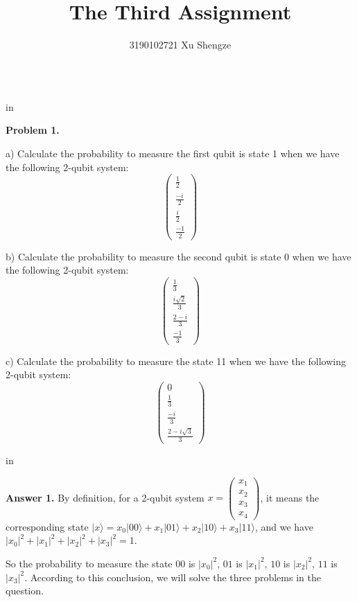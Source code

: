 \documentclass[11pt]{article}
\begin{document}
\title{{\bf The Third Assignment}}
\author{3190102721 Xu Shengze}
\date{}
\maketitle

\begin{tabular*}{13cm}{r}
\hline
\end{tabular*}

 in

{\bf Problem 1.} 

a) Calculate the probability to measure the first qubit is state 1 when we have the following 2-qubit system:
$$
\begin{pmatrix}
\frac{1}{2}\\
\frac{-i}{2}\\
\frac{i}{2}\\
\frac{-1}{2}
\end{pmatrix}
$$

b) Calculate the probability to measure the second qubit is state 0 when we have the 
following 2-qubit system:
$$
\begin{pmatrix}
	\frac{1}{3}\\
	\frac{i\sqrt{2}}{3}\\
	\frac{2-i}{3}\\
	\frac{-1}{3}
\end{pmatrix}
$$

c) Calculate the probability to measure the state 11 when we have the following 2-qubit 
system:
$$
\begin{pmatrix}
	0\\
	\frac{1}{3}\\
	\frac{-i}{3}\\
	\frac{2-i\sqrt{3}}{3}
\end{pmatrix}
$$

 in

{\bf Answer 1.} By definition, for a 2-qubit system $x=\begin{pmatrix}x_1\\x_2\\x_3\\x_4\end{pmatrix}$, it means the corresponding state $|x\rangle=x_0|00\rangle+x_1|01\rangle+x_2|10\rangle+x_3|11\rangle$, and we have $|x_0|^2+|x_1|^2+|x_2|^2+|x_3|^2=1$.

So the probability to measure the state $00$ is $|x_0|^2$, $01$ is $|x_1|^2$, $10$ is $|x_2|^2$, $11$ is $|x_3|^2$. According to this conclusion, we will solve the three problems in the question.
\end{document}
